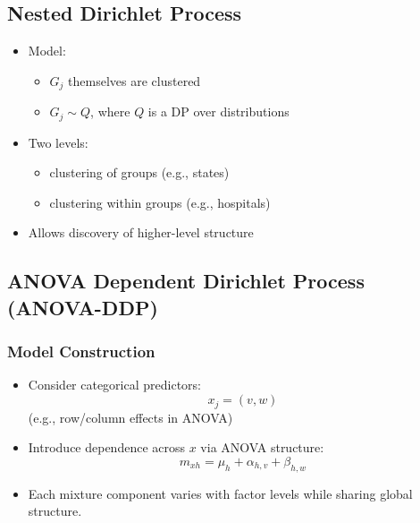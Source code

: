 \documentclass[12pt,oneside]{book}
\numberwithin{equation}{section}
\theoremstyle{definition}
\theoremstyle{plain}
\theoremstyle{remark}
\begin{document}
\subsection{Nested Dirichlet Process}

\begin{itemize}
\item Model:
\begin{itemize}
\item $G_j$ themselves are clustered
\item $G_j \sim Q$, where $Q$ is a DP over distributions
\end{itemize}
\item Two levels:
\begin{itemize}
\item clustering of groups (e.g., states)
\item clustering within groups (e.g., hospitals)
\end{itemize}
\item Allows discovery of higher-level structure
\end{itemize}

\subsection{ANOVA Dependent Dirichlet Process (ANOVA-DDP)}

\subsubsection*{Model Construction}
\begin{itemize}
\item Consider categorical predictors:
\[
x_j = (v, w)
\]
(e.g., row/column effects in ANOVA)

\item Introduce dependence across $x$ via ANOVA structure:
\[
m_{xh} = \mu_h + \alpha_{h,v} + \beta_{h,w}
\]

\item Each mixture component varies with factor levels while sharing global structure.
\end{itemize}
\end{document}
